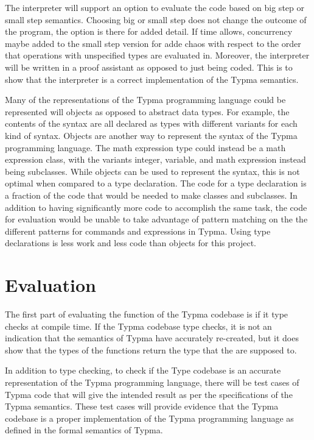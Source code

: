 \documentclass[10pt,twocolumn]{article}
\begin{document}
The interpreter will support an option to evaluate the code based on big step or small step semantics. Choosing big or small step does not change the outcome of the program, the option is there for added detail. If time allows, concurrency maybe added to the small step version for adde chaos with respect to the order that operations with unspecified types are evaluated in. Moreover, the interpreter will be written in a proof assistant as opposed to just being coded. This is to show that the interpreter is a correct implementation of the Typma semantics.

Many of the representations of the Typma programming language could be represented will objects as opposed to abstract data types. For example, the contents of the syntax are all declared as types with different variants for each kind of syntax. Objects are another way to represent the syntax of the Typma programming language. The math expression type could instead be a math expression class, with the variants integer, variable, and math expression instead being subclasses. While objects can be used to represent the syntax, this is not optimal when compared to a type declaration. The code for a type declaration is a fraction of the code that would be needed to make classes and subclasses. In addition to having significantly more code to accomplish the same task, the code for evaluation would be unable to take advantage of pattern matching on the the different patterns for commands and expressions in Typma. Using type declarations is less work and less code than objects for this project.

\section{Evaluation} 

The first part of evaluating the function of the Typma codebase is if it type checks at compile time. If the Typma codebase type checks, it is not an indication that the semantics of Typma have accurately re-created, but it does show that the types of the functions return the type that the are supposed to.

In addition to type checking, to check if the Type codebase is an accurate representation of the Typma programming language, there will be test cases of Typma code that will give the intended result as per the specifications of the Typma semantics. These test cases will provide evidence that the Typma codebase is a proper implementation of the Typma programming language as defined in the formal semantics of Typma.
\end{document}
